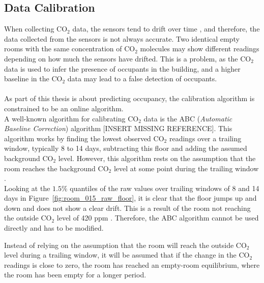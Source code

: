 \subsection{Data Calibration}

When collecting $\text{CO}_2$ data, the sensors tend to drift over time \parencite{pulse2025co2calibration},
and therefore, the data collected from the sensors
is not always accurate. Two identical empty rooms with the same concentration of $\text{CO}_2$ molecules may show different
readings depending on how much the sensors have drifted.
This is a problem, as the $\text{CO}_2$ data is used to infer the presence of occupants in the building, and a
higher baseline in the $\text{CO}_2$ data may lead to a false detection of occupants.\\
\\
As part of this thesis is about predicting occupancy, the calibration algorithm is constrained to be an online algorithm.\\
A well-known algorithm for calibrating $\text{CO}_2$ data is the ABC (\textit{Automatic Baseline Correction}) algorithm [INSERT MISSING REFERENCE]. This algorithm works by
finding the lowest observed $\text{CO}_2$ readings over a trailing window, typically 8 to 14 days, subtracting this floor and adding the assumed background $\text{CO}_2$ level.
However, this algorithm rests on the assumption that the room reaches the background $\text{CO}_2$ level at some point during the trailing window \parencite{senseair_abc}. \\
Looking at the $1.5\%$ quantiles of the raw values over trailing windows of 8 and 14 days in Figure~\ref{fig:room_015_raw_floor}, it is clear
that the floor jumps up and down and does not show a clear drift. This is a result of the room not reaching
the outside $\text{CO}_2$ level of 420 ppm \parencite{icos2023ghg}. Therefore, the ABC algorithm cannot be used directly and has to be modified.

Instead of relying on the assumption that the room will reach the outside $\text{CO}_2$ level during a trailing window, it will be assumed
that if the change in the $\text{CO}_2$ readings is close to zero, the room has reached an empty-room equilibrium, where
the room has been empty for a longer period.
\bigskip

